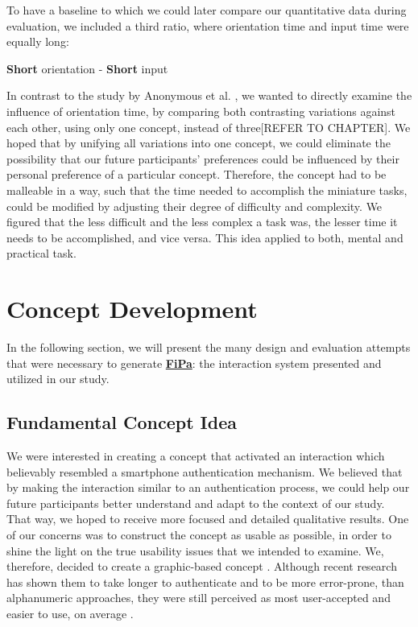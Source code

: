 To have a baseline to which we could later compare our quantitative data during evaluation, we included a third ratio, where orientation time and input time were equally long:  
\begin{center}
\textbf{Short} orientation - \textbf{Short} input
\end{center} 

In contrast to the study by Anonymous et al. \cite{anonymous}, we wanted to directly examine the influence of orientation time, by comparing both contrasting variations against each other, using only one concept, instead of three[REFER TO CHAPTER]. We hoped that by unifying all variations into one concept, we could eliminate the possibility that our future participants' preferences could be influenced by their personal preference of a particular concept. Therefore, the concept had to be malleable in a way, such that the time needed to accomplish the miniature tasks, could be modified by adjusting their degree of difficulty and complexity. We figured that the less difficult and the less complex a task was, the lesser time it needs to be accomplished, and vice versa. This idea applied to both, mental and practical task.

\section{Concept Development}

In the following section, we will present the many design and evaluation attempts that were necessary to generate \underline{\textbf{FiPa}}: the interaction system presented and utilized in our study. 

\subsection{Fundamental Concept Idea}
We were interested in creating a concept that activated an interaction which believably resembled a smartphone authentication mechanism. We believed that by making the interaction similar to an authentication process, we could help our future participants better understand and adapt to the context of our study. That way, we hoped to receive more focused and detailed qualitative results. One of our concerns was to construct the concept as usable as possible, in order to shine the light on the true usability issues that we intended to examine. We, therefore, decided to create a graphic-based concept \cite{AnatomySmartphone}. Although recent research has shown them to take longer to authenticate and to be more error-prone, than alphanumeric approaches, they were still perceived as most user-accepted and easier to use, on average \cite{PatternWild}.\\

